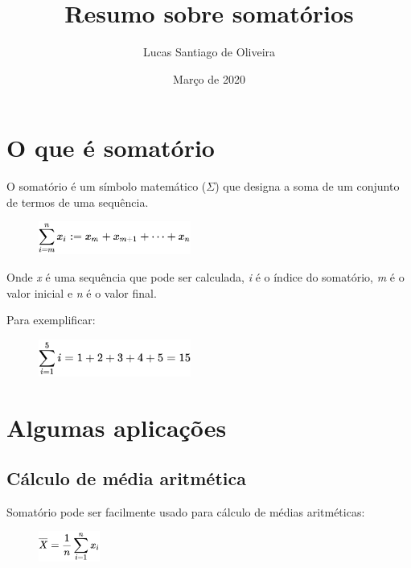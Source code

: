 \documentclass{article}
\title{Resumo sobre somatórios}
\author{Lucas Santiago de Oliveira}
\date{Março de 2020}
\begin{document}
\maketitle

\section{O que é somatório}
\hspace{4mm} O somatório é um símbolo matemático ($\Sigma$) que designa a soma de um conjunto de termos de uma sequência. 

\begin{figure}[h]
\centering
\includegraphics[width=5cm]{Somatorio.png}
\label{Figura:Exemplo de Somatório}
\end{figure}

Onde \emph{x} é uma sequência que pode ser calculada, \emph{i} é o índice do somatório, \emph{m} é o valor inicial e \emph{n} é o valor final.

Para exemplificar:

\begin{figure}[h]
\centering
\includegraphics[width=5cm]{sequencia.png}
\label{Figura:Exemplo de sequência}
\end{figure}

\section{Algumas aplicações}

\subsection{Cálculo de média aritmética}
\hspace{4mm} Somatório pode ser facilmente usado para cálculo de médias aritméticas:

\begin{figure}[h]
\centering
\includegraphics[width=2cm]{media.png}
\label{Figura:Exemplo de sequência}
\end{figure}
\end{document}
